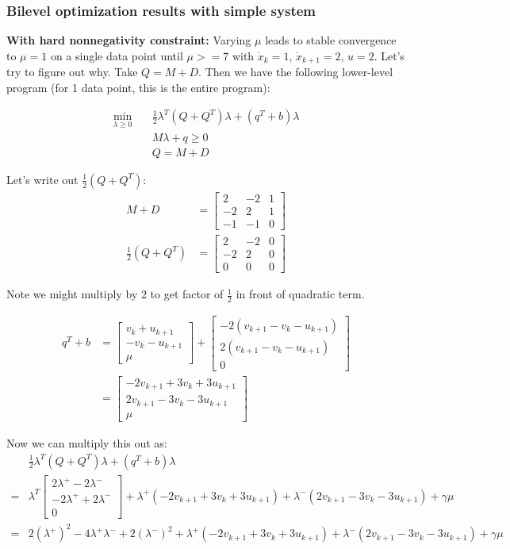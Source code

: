 \documentclass{article}
\newcommand{\rvec}[1]{\begin{bmatrix} #1 \end{bmatrix}}
\begin{document}
\subsubsection{Bilevel optimization results with simple system}
\textbf{With hard nonnegativity constraint: } Varying $\mu$ leads to stable convergence to $\mu=1$ on a single data point until $\mu >= 7$ with $\dot x_k = 1$, $\dot x_{k+1} = 2$, $u = 2$. Let's try to figure out why. Take $Q = M + D$. Then we have the following lower-level program (for 1 data point, this is the entire program):

\begin{align*}
    \min _{\lambda \geq 0} \quad & \frac{1}{2} \lambda^T (Q + Q^T)  \lambda + (q^T + b) \lambda \\
                                   &M \lambda + q \geq 0 \\
                                   & Q = M + D
\end{align*}

Let's write out $\frac{1}{2} (Q + Q^T)$:
\begin{align*}
    M + D &= \begin{bmatrix} 2 & -2 & 1 \\ -2 & 2 & 1 \\ -1 & -1 & 0 \end{bmatrix} \\
    \frac{1}{2} (Q + Q^T) &= \begin{bmatrix} 2 & -2 & 0 \\ -2 & 2 & 0 \\ 0 & 0 & 0 \end{bmatrix}
\end{align*}

Note we might multiply by 2 to get factor of $\frac{1}{2}$ in front of quadratic term.

\begin{align*}
    q^T + b &= \rvec{v_k + u_{k+1} \\ -v_k - u_{k+1} \\ \mu} + 
    \rvec{-2 (v_{k+1} - v_k - u_{k+1}) \\ 2 (v_{k+1} - v_k - u_{k+1}) \\ 0} \\
            &= \rvec{-2 v_{k+1} + 3 v_k + 3 u_{k+1} \\
                     2 v_{k+1} - 3 v_k - 3 u_{k+1} \\ \mu}
\end{align*}

Now we can multiply this out as:
\begin{align*}
  &\frac{1}{2} \lambda^T (Q + Q^T)  \lambda + (q^T + b) \lambda \\
    = & \lambda^T \rvec{2 \lambda^+ - 2 \lambda^- \\ -2 \lambda^+ + 2 \lambda^- \\ 0} + \lambda^+ (-2 v_{k+1} + 3 v_k + 3 u_{k+1}) + \lambda^- (2 v_{k+1} - 3 v_k - 3 u_{k+1}) + \gamma \mu \\
    = & 2 (\lambda^+) ^2 - 4 \lambda^+ \lambda^- + 2 (\lambda^-) ^2+ \lambda^+ (-2 v_{k+1} + 3 v_k + 3 u_{k+1}) + \lambda^- (2 v_{k+1} - 3 v_k - 3 u_{k+1}) + \gamma \mu
\end{align*}
\end{document}
